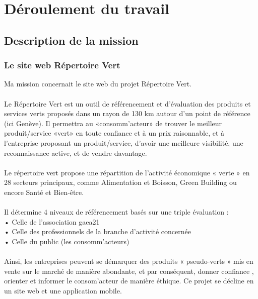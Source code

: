 \section{Déroulement du travail}


\subsection{Description de la mission}
\subsubsection{Le site web Répertoire Vert}

Ma mission concernait le site web du projet Répertoire Vert.
\\\\
Le Répertoire Vert est un outil de référencement et d’évaluation des produits et services verts proposés dans un rayon de 130 km autour d’un point de référence (ici Genève). 
Il permettra au «consomm’acteur» de trouver le meilleur produit/service «vert» en toute confiance et à un prix raisonnable, 
et à l’entreprise proposant un produit/service, d’avoir une meilleure visibilité, une reconnaissance active, et de vendre davantage.
\\\\

Le répertoire vert propose une répartition de l’activité économique « verte » en 28
secteurs principaux, comme Alimentation et Boisson, Green Building ou encore Santé et Bien-être.
\\\\
Il détermine 4 niveaux de référencement basés sur une triple évaluation :\\
• Celle de l’association gaea21\\
• Celle des professionnels de la branche d’activité concernée\\
• Celle du public (les consomm’acteurs)\\
\\
Ainsi, les entreprises peuvent se démarquer des produits « pseudo-verts » mis en vente sur le marché de manière abondante, et par conséquent, donner confiance , orienter et informer le consom’acteur de manière éthique.
Ce projet se décline en un site web et une application mobile.
\\\\

